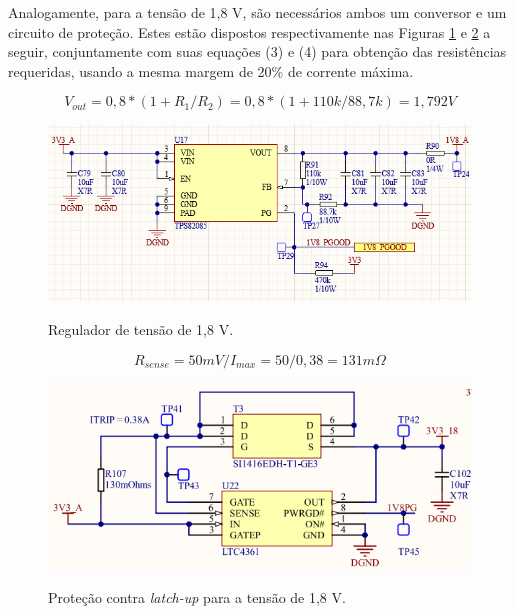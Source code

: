 Analogamente, para a tensão de 1,8 V, são necessários ambos um conversor e um circuito de proteção. Estes estão dispostos respectivamente nas Figuras \ref{fig:1v8supp} e \ref{fig:1v8ocp} a seguir, conjuntamente com suas equações (3) e (4) para obtenção das resistências requeridas, usando a mesma margem de 20\% de corrente máxima. 

\begin{equation}
	V_{out} = 0,8 * (1 + R_1/R_2) = 0,8 * (1+ 110k/88,7k) = 1,792 V
\end{equation} 

\begin{figure}[H]
    \centering
    \caption{Regulador de tensão de 1,8 V.}
    \includegraphics[scale=0.8]{images/1v8supp.png}
    \label{fig:1v8supp}
\end{figure}

\begin{equation}
	R_{sense} = 50 mV / I_{max} =50 / 0,38 = 131 m\Omega
\end{equation} 

\begin{figure}[H]
    \centering
    \caption{Proteção contra \textit{latch-up} para a tensão de 1,8 V.}
    \includegraphics[scale=1]{images/1v8ocp.png}
    \label{fig:1v8ocp}
\end{figure}

